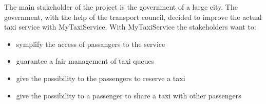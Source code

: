 The main stakeholder of the project is the government of a large city.
The government, with the help of the transport council, decided to improve the actual taxi service with MyTaxiService.
With MyTaxiService the stakeholders want to:

\begin{itemize}
	\item symplify the access of passangers to the service
	\item guarantee a fair management of taxi queues
	\item give the possibility to the passengers to reserve a taxi 
	\item give the possibility to a passenger to share a taxi with other passengers
	
\end{itemize}